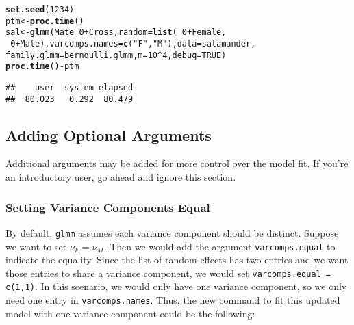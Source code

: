 \documentclass[11pt]{article}\usepackage[]{graphicx}\usepackage[]{color}
\makeatletter
\newcommand{\hlnum}[1]{\textcolor[rgb]{0.686,0.059,0.569}{#1}}%
\newcommand{\hlstr}[1]{\textcolor[rgb]{0.192,0.494,0.8}{#1}}%
\newcommand{\hlopt}[1]{\textcolor[rgb]{0,0,0}{#1}}%
\newcommand{\hlstd}[1]{\textcolor[rgb]{0.345,0.345,0.345}{#1}}%
\newcommand{\hlkwb}[1]{\textcolor[rgb]{0.69,0.353,0.396}{#1}}%
\newcommand{\hlkwc}[1]{\textcolor[rgb]{0.333,0.667,0.333}{#1}}%
\newcommand{\hlkwd}[1]{\textcolor[rgb]{0.737,0.353,0.396}{\textbf{#1}}}%
\newenvironment{kframe}{%
 \def\at@end@of@kframe{}%
 \ifinner\ifhmode%
  \def\at@end@of@kframe{\end{minipage}}%
  \begin{minipage}{\columnwidth}%
 \fi\fi%
 \def\FrameCommand##1{\hskip\@totalleftmargin \hskip-\fboxsep
 \colorbox{shadecolor}{##1}\hskip-\fboxsep
     \hskip-\linewidth \hskip-\@totalleftmargin \hskip\columnwidth}%
 \MakeFramed {\advance\hsize-\width
   \@totalleftmargin\z@ \linewidth\hsize
   \@setminipage}}%
 {\par\unskip\endMakeFramed%
 \at@end@of@kframe}
\newenvironment{knitrout}{}{} %
\makeatother
\begin{document}
\begin{knitrout}
\color{fgcolor}\begin{kframe}
\begin{alltt}
\hlkwd{set.seed}\hlstd{(}\hlnum{1234}\hlstd{)}
\hlstd{ptm}\hlkwb{<-}\hlkwd{proc.time}\hlstd{()}
\hlstd{sal} \hlkwb{<-} \hlkwd{glmm}\hlstd{(Mate} \hlopt{~} \hlnum{0} \hlopt{+} \hlstd{Cross,} \hlkwc{random} \hlstd{=} \hlkwd{list}\hlstd{(}\hlopt{~} \hlnum{0} \hlopt{+} \hlstd{Female,}
\hlopt{~} \hlnum{0} \hlopt{+} \hlstd{Male),} \hlkwc{varcomps.names} \hlstd{=} \hlkwd{c}\hlstd{(}\hlstr{"F"}\hlstd{,} \hlstr{"M"}\hlstd{),} \hlkwc{data} \hlstd{= salamander,}
\hlkwc{family.glmm} \hlstd{= bernoulli.glmm,} \hlkwc{m} \hlstd{=} \hlnum{10}\hlopt{^}\hlnum{4}\hlstd{,} \hlkwc{debug} \hlstd{=} \hlnum{TRUE}\hlstd{)}
\hlkwd{proc.time}\hlstd{()} \hlopt{-} \hlstd{ptm}
\end{alltt}
\begin{verbatim}
##    user  system elapsed 
##  80.023   0.292  80.479
\end{verbatim}
\end{kframe}
\end{knitrout}

\subsection{Adding Optional Arguments}
Additional arguments may be added for more control over the model fit. If you're an introductory user, go ahead and ignore this section.\\

\subsubsection{Setting Variance Components Equal}
By default, \texttt{glmm} assumes each variance component should be distinct. Suppose we want to set $\nu_F = \nu_M.$ Then we would add the argument \texttt{varcomps.equal} to indicate the equality. Since the list of random effects has two entries and we want those entries to share a variance component, we would set \texttt{varcomps.equal = c(1,1)}. In this scenario, we would only have one variance component, so we only need one entry in \texttt{varcomps.names}. Thus, the new command to fit this updated model with one variance component could be the following: 
\end{document}
